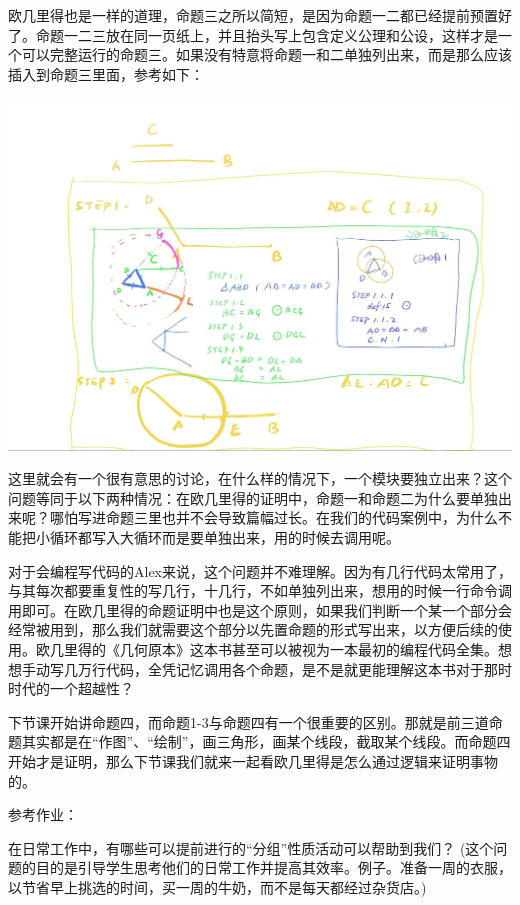 \documentclass[
]{book}
\begin{document}
欧几里得也是一样的道理，命题三之所以简短，是因为命题一二都已经提前预置好了。命题一二三放在同一页纸上，并且抬头写上包含定义公理和公设，这样才是一个可以完整运行的命题三。如果没有特意将命题一和二单独列出来，而是那么应该插入到命题三里面，参考如下：

\includegraphics[width=1\linewidth]{./image/03-prop3-image4}

这里就会有一个很有意思的讨论，在什么样的情况下，一个模块要独立出来？这个问题等同于以下两种情况：在欧几里得的证明中，命题一和命题二为什么要单独出来呢？哪怕写进命题三里也并不会导致篇幅过长。在我们的代码案例中，为什么不能把小循环都写入大循环而是要单独出来，用的时候去调用呢。

对于会编程写代码的Alex来说，这个问题并不难理解。因为有几行代码太常用了，与其每次都要重复性的写几行，十几行，不如单独列出来，想用的时候一行命令调用即可。在欧几里得的命题证明中也是这个原则，如果我们判断一个某一个部分会经常被用到，那么我们就需要这个部分以先置命题的形式写出来，以方便后续的使用。欧几里得的《几何原本》这本书甚至可以被视为一本最初的编程代码全集。想想手动写几万行代码，全凭记忆调用各个命题，是不是就更能理解这本书对于那时时代的一个超越性？

下节课开始讲命题四，而命题1-3与命题四有一个很重要的区别。那就是前三道命题其实都是在``作图''、``绘制''，画三角形，画某个线段，截取某个线段。而命题四开始才是证明，那么下节课我们就来一起看欧几里得是怎么通过逻辑来证明事物的。

参考作业：

在日常工作中，有哪些可以提前进行的``分组''性质活动可以帮助到我们？
(这个问题的目的是引导学生思考他们的日常工作并提高其效率。例子。准备一周的衣服，以节省早上挑选的时间，买一周的牛奶，而不是每天都经过杂货店。)
\end{document}
